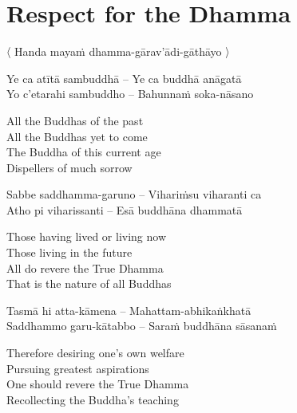 \suttaRef{[Dhp 153-154]}


\section{Respect for the Dhamma}
\label{respect-for-the-dhamma}

\begin{leader}
  〈 Handa mayaṁ dhamma-gārav'ādi-gāthāyo 〉

\end{leader}

\begin{twochants}
  Ye ca atītā sambuddhā – Ye ca buddhā anāgatā \\
  Yo c'etarahi sambuddho – Bahunnaṁ soka-nāsano \\
\end{twochants}

\begin{english-verses}
  All the Buddhas of the past\\
  All the Buddhas yet to come\\
  The Buddha of this current age\\
  Dispellers of much sorrow
\end{english-verses}

\begin{twochants}
  Sabbe saddhamma-garuno – Vihariṁsu viharanti ca\\
  Atho pi viharissanti – Esā buddhāna dhammatā\\
\end{twochants}

\begin{english-verses}
  Those having lived or living now\\
  Those living in the future\\
  All do revere the True Dhamma\\
  That is the nature of all Buddhas
\end{english-verses}

\begin{twochants}
  Tasmā hi atta-kāmena – Mahattam-abhikaṅkhatā\\
  Saddhammo garu-kātabbo – Saraṁ buddhāna sāsanaṁ\\
\end{twochants}

\begin{english-verses}
  Therefore desiring one's own welfare\\
  Pursuing greatest aspirations\\
  One should revere the True Dhamma\\
  Recollecting the Buddha's teaching
\end{english-verses}

